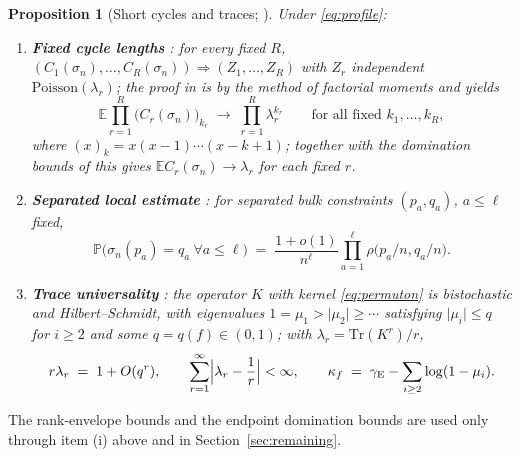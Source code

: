 \documentclass[11pt]{article}
\newcommand{\E}{\mathbb{E}}
\newcommand{\Prob}{\mathbb{P}}
\newcommand{\1}{\mathbf{1}}
\newcommand{\Tr}{\mathrm{Tr}}
\newcommand{\Poisson}{\mathrm{Poisson}}
\newcommand{\gE}{\gamma_{\mathrm{E}}}
\newtheorem{proposition}[theorem]{Proposition}
\theoremstyle{remark}
\begin{document}
\begin{proposition}[Short cycles and traces; \cite{Lon26}]\label{prop:short}
Under \eqref{eq:profile}:
\begin{enumerate}[label=(\roman*)]
\item \textbf{Fixed cycle lengths} \cite[Theorem~5.1]{Lon26}: for every fixed
$R$, $(C_1(\sigma_n),\dots,C_R(\sigma_n))\Rightarrow(Z_1,\dots,Z_R)$ with
$Z_r$ independent $\Poisson(\lambda_r)$; the proof in \cite{Lon26} is by the
method of factorial moments and yields
\begin{equation}\label{eq:fixed-fm}
\E\prod_{r=1}^R\bigl(C_r(\sigma_n)\bigr)_{k_r}\;\longrightarrow\;
\prod_{r=1}^R\lambda_r^{k_r}\qquad\text{for all fixed }k_1,\dots,k_R,
\end{equation}
where $(x)_k=x(x-1)\cdots(x-k+1)$; together with the domination bounds of
\cite[Lemmas~5.8--5.13]{Lon26} this gives $\E C_r(\sigma_n)\to\lambda_r$ for
each fixed $r$.
\item \textbf{Separated local estimate} \cite[Proposition~5.7]{Lon26}: for
separated bulk constraints $(p_a,q_a)$, $a\le\ell$ fixed,
\begin{equation}\label{eq:separated}
\Prob\bigl(\sigma_n(p_a)=q_a\ \forall a\le\ell\bigr)
\;=\;\frac{1+o(1)}{n^\ell}\prod_{a=1}^\ell \rho\bigl(p_a/n,q_a/n\bigr).
\end{equation}
\item \textbf{Trace universality} \cite[Theorem~5.19, Lemmas~5.17--5.18]
{Lon26}: the operator $K$ with kernel \eqref{eq:permuton} is bistochastic and
Hilbert--Schmidt, with eigenvalues $1=\mu_1>\lvert\mu_2\rvert\ge\cdots$
satisfying $\lvert\mu_i\rvert\le q$ for $i\ge2$ and some $q=q(f)\in(0,1)$;
with $\lambda_r=\Tr(K^r)/r$,
\begin{equation}\label{eq:trace-gap}
r\lambda_r\;=\;1+O(q^r),\qquad
\sum_{r=1}^\infty\Bigl|\lambda_r-\frac1r\Bigr|<\infty,\qquad
\kappa_f\;=\;\gE-\sum_{i\ge2}\log(1-\mu_i).
\end{equation}
\end{enumerate}
\end{proposition}

The rank-envelope bounds \cite[Lemmas~5.8--5.10]{Lon26} and the endpoint
domination bounds \cite[Lemmas~5.11--5.13]{Lon26} are used only through item
(i) above and in Section~\ref{sec:remaining}.
\end{document}
